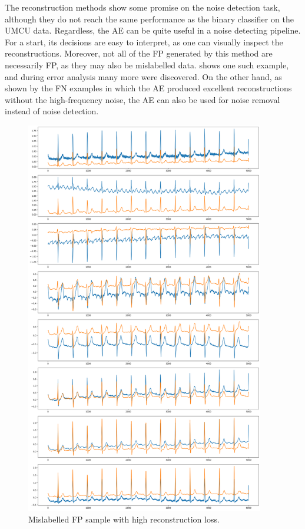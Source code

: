 \documentclass[a4paper,10pt]{article}
\begin{document}
The reconstruction methods show some promise on the noise detection task, although they do not reach the same performance as the binary classifier on the UMCU data. Regardless, the AE can be quite useful in a noise detecting pipeline. For a start, its decisions are easy to interpret, as one can visually inspect the reconstructions. Moreover, not all of the FP generated by this method are necessarily FP, as they may also be mislabelled data.  shows one such example, and during error analysis many more were discovered. On the other hand, as shown by the FN examples in which the AE produced excellent reconstructions without the high-frequency noise, the AE can also be used for noise removal instead of noise detection.

\begin{figure}[htbp]
	\centering
	\includegraphics[width=0.93\textwidth]{fp_mislabelled.png}
	\caption{Mislabelled FP sample with high reconstruction loss.}%
	\label{fig:fp_mislabelled}
\end{figure}
\end{document}
